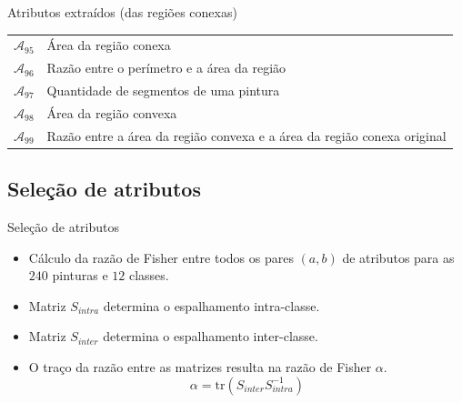 \documentclass{beamer}
\begin{document}
\begin{frame}{Atributos extraídos (das regiões conexas)}
{\begin{table}
\begin{center}
{\begin{tabular}{l|l}
    $\mathcal{A}_{95}$ &
    Área da região conexa \\

    $\mathcal{A}_{96}$ &
    Razão entre o perímetro e a área da região \\

    $\mathcal{A}_{97}$ &
    Quantidade de segmentos de uma pintura \\

    $\mathcal{A}_{98}$ &
    Área da região convexa \\

    $\mathcal{A}_{99}$ &
    Razão entre a área da região convexa e a área da região conexa original \\

     \hline \hline
    \end{tabular}}

  \end{center}
\end{table}    
}
\end{frame}


\subsection{Seleção de atributos}
\begin{frame}{Seleção de atributos}

  \begin{itemize}
    \item Cálculo da razão de Fisher entre todos os pares $(a,b)$ de atributos para as $240$ pinturas e $12$ classes.
    \pause
    \item Matriz $S_{intra}$ determina o espalhamento intra-classe.
    \pause
    \item Matriz $S_{inter}$ determina o espalhamento inter-classe.
    \pause
    \item O traço da razão entre as matrizes resulta na razão de Fisher $\alpha$.
    \begin{equation} \label{eq:alpha}
    \alpha = \mathrm{tr}(S_{inter} S_{intra}^{-1})
    \end{equation}
  \end{itemize}

\end{frame}
\end{document}
